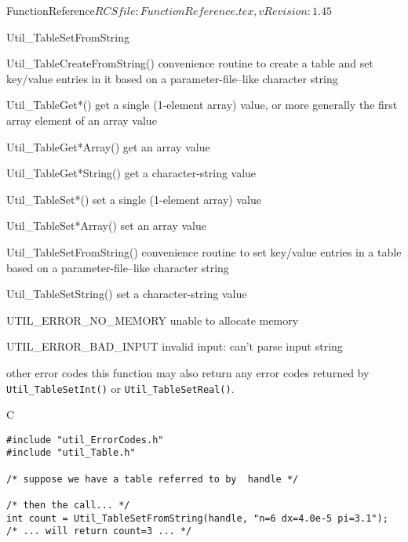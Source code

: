 \begin{cactuspart}{5}{FunctionReference}{$RCSfile: FunctionReference.tex,v $}{$Revision: 1.45 $}
\begin{FunctionDescription}{Util\_TableSetFromString}
\begin{SeeAlso}{Util\_TableCreateFromString()}
convenience routine to create a table and set key/value entries
in it based on a parameter-file--like character string
\end{SeeAlso}
\begin{SeeAlso}{Util\_TableGet*()}
get a single (1-element array) value,
or more generally the first array element of an array value
\end{SeeAlso}
\begin{SeeAlso}{Util\_TableGet*Array()}
get an array value
\end{SeeAlso}
\begin{SeeAlso}{Util\_TableGet*String()}
get a character-string value
\end{SeeAlso}
\begin{SeeAlso}{Util\_TableSet*()}
set a single (1-element array) value
\end{SeeAlso}
\begin{SeeAlso}{Util\_TableSet*Array()}
set an array value
\end{SeeAlso}
\begin{SeeAlso}{Util\_TableSetFromString()}
convenience routine to set key/value entries in a table based on a
parameter-file--like character string
\end{SeeAlso}
\begin{SeeAlso}{Util\_TableSetString()}
set a character-string value
\end{SeeAlso}

\begin{Error}{UTIL\_ERROR\_NO\_MEMORY}
unable to allocate memory
\end{Error}
\begin{Error}{UTIL\_ERROR\_BAD\_INPUT}
invalid input: can't parse input string
\end{Error}
\begin{Error}{\rm other error codes}
this function may also return any error codes returned by
\verb|Util_TableSetInt()| or \verb|Util_TableSetReal()|.
\end{Error}

\begin{Example}{C}
\begin{verbatim}
#include "util_ErrorCodes.h"
#include "util_Table.h"

/* suppose we have a table referred to by  handle */

/* then the call... */
int count = Util_TableSetFromString(handle, "n=6 dx=4.0e-5 pi=3.1");
/* ... will return count=3 ... */


\end{verbatim}
\end{Example}
\end{FunctionDescription}
\end{cactuspart}
